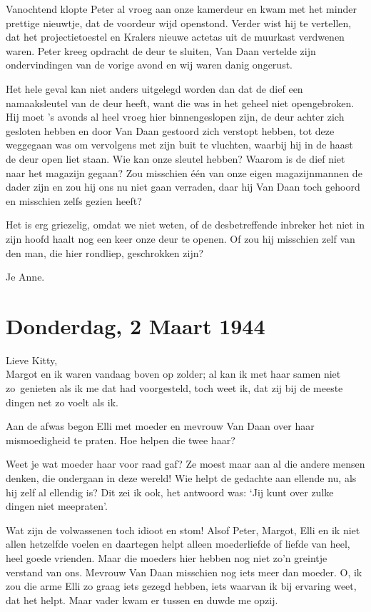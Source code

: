 \documentclass{book}
\begin{document}
Vanochtend klopte Peter al vroeg aan onze kamerdeur en kwam met het minder
prettige nieuwtje, dat de voordeur wijd openstond. Verder wist hij te vertellen,
dat het projectietoestel en Kralers nieuwe actetas uit de muurkast verdwenen
waren. Peter kreeg opdracht de deur te sluiten, Van Daan vertelde zijn
ondervindingen van de vorige avond en wij waren danig ongerust.

Het hele geval kan niet anders uitgelegd worden dan dat de dief een
namaaksleutel van de deur heeft, want die was in het geheel niet opengebroken.
Hij moet 's avonds al heel vroeg hier binnengeslopen zijn, de deur achter zich
gesloten hebben en door Van Daan gestoord zich verstopt hebben, tot deze
weggegaan was om vervolgens met zijn buit te vluchten, waarbij hij in de haast
de deur open liet staan. Wie kan onze sleutel hebben? Waarom is de dief niet
naar het magazijn gegaan? Zou misschien één van onze eigen magazijnmannen de
dader zijn en zou hij ons nu niet gaan verraden, daar hij Van Daan toch gehoord
en misschien zelfs gezien heeft?

Het is erg griezelig, omdat we niet weten, of de desbetreffende inbreker het
niet in zijn hoofd haalt nog een keer onze deur te openen. Of zou hij misschien
zelf van den man, die hier rondliep, geschrokken zijn?

Je Anne.

\section*{Donderdag, 2 Maart 1944}

Lieve Kitty,\\
Margot en ik waren vandaag boven op zolder; al kan ik met haar
samen niet zo~genieten als ik me dat had voorgesteld, toch weet ik, dat zij bij
de meeste dingen net zo voelt als ik.

Aan de afwas begon Elli met moeder en mevrouw Van Daan over haar mismoedigheid
te praten. Hoe helpen die twee haar?

Weet je wat moeder haar voor raad gaf? Ze moest maar aan al die andere mensen
denken, die ondergaan in deze wereld! Wie helpt de gedachte aan ellende nu, als
hij zelf al ellendig is? Dit zei ik ook, het antwoord was: `Jij kunt over zulke
dingen niet meepraten'.

Wat zijn de volwassenen toch idioot en stom! Alsof Peter, Margot, Elli en ik
niet allen hetzelfde voelen en daartegen helpt alleen moederliefde of liefde van
heel, heel goede vrienden. Maar die moeders hier hebben nog niet zo'n greintje
verstand van ons. Mevrouw Van Daan misschien nog iets meer dan moeder. O, ik zou
die arme Elli zo graag iets gezegd hebben, iets waarvan ik bij ervaring weet,
dat het helpt. Maar vader kwam er tussen en duwde me opzij.
\end{document}
